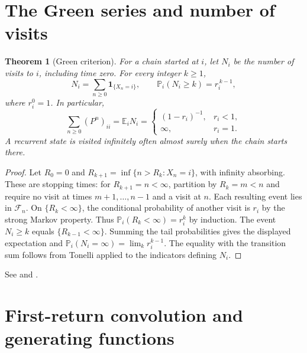 \documentclass[11pt,oneside,openany]{book}
\theoremstyle{plain}
\newtheorem{theorem}{Theorem}[chapter]
\theoremstyle{definition}
\theoremstyle{remark}
\begin{document}
\section{The Green series and number of visits}\label{p207:W10}

\begin{theorem}[Green criterion]
For a chain started at \(i\), let \(N_i\) be the number of visits
to \(i\), including time zero. For every integer \(k\ge1\),
\[
 N_i=\sum_{n\ge0}\mathbf{1}_{\{X_n=i\}},\qquad
 \mathbb P_i(N_i\ge k)=r_i^{\,k-1},
\]
where \(r_i^0=1\).
In particular,
\[
 \sum_{n\ge0}(P^n)_{ii}=\mathbb E_iN_i
 =\begin{cases}
 (1-r_i)^{-1},& r_i<1,\\
 \infty,& r_i=1.
 \end{cases}
\]
A recurrent state is visited infinitely often almost surely when the
chain starts there.
\end{theorem}
\begin{proof}
Let \(R_0=0\) and \(R_{k+1}=\inf\{n>R_k:X_n=i\}\), with infinity
absorbing. These are stopping times: for \(R_{k+1}=n<\infty\),
partition by \(R_k=m<n\) and require no visit at times \(m+1,\ldots,n-1\)
and a visit at \(n\). Each resulting event lies in \(\mathcal F_n\).
On \(\{R_k<\infty\}\), the conditional probability of another visit
is \(r_i\) by the strong Markov property. Thus
\(\mathbb P_i(R_k<\infty)=r_i^k\) by induction.
The event \(N_i\ge k\) equals \(\{R_{k-1}<\infty\}\).
Summing the tail probabilities gives the displayed expectation
and \(\mathbb P_i(N_i=\infty)=\lim_k r_i^{k-1}\).
The equality with the transition sum follows from Tonelli applied
to the indicators defining \(N_i\).
\end{proof}

See \cite[Section 1.5]{Norris} and \cite[Section 5.3]{Durrett}.

\section{First-return convolution and generating functions}\label{p207:W11}
\end{document}
